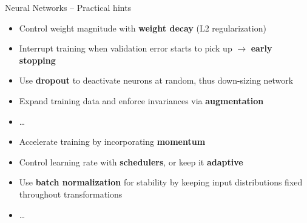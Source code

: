 \begin{frame}{Neural Networks -- Practical hints}

\begin{itemize}
  \item Control weight magnitude with \textbf{weight decay} (L2 
  regularization)
  \item Interrupt training when validation error starts to pick up 
  $\rightarrow$ \textbf{early stopping}
  \item Use \textbf{dropout} to deactivate neurons at random, thus down-sizing 
  network
  \item Expand training data and enforce invariances via \textbf{augmentation}
  \item \dots
\end{itemize}

\begin{itemize}
  \item Accelerate training by incorporating \textbf{momentum}
  \item Control learning rate with \textbf{schedulers}, or keep it 
  \textbf{adaptive}
  \item Use \textbf{batch normalization} for stability by keeping 
  input distributions fixed throughout transformations
  \item \dots
\end{itemize}

% 
% 
% 
% 
% 


\end{frame}
